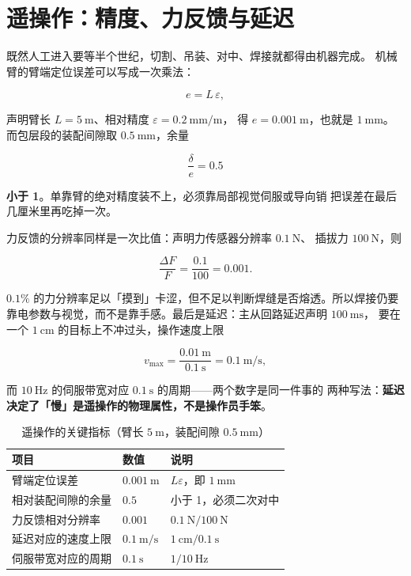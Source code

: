 \section{遥操作：精度、力反馈与延迟}
\label{sec:app-ap-teleop}

既然人工进入要等半个世纪，切割、吊装、对中、焊接就都得由机器完成。
机械臂的臂端定位误差可以写成一次乘法：

\begin{equation}
e = L\,\varepsilon,
\label{eq:app-ap-err}
\end{equation}

声明臂长 $L = 5\ \mathrm{m}$、相对精度 $\varepsilon = 0.2\ \mathrm{mm}/\mathrm{m}$，
得 $e = 0.001\ \mathrm{m}$，也就是 \textbf{$1\ \mathrm{mm}$}。而包层段的装配间隙取
$0.5\ \mathrm{mm}$，余量

\begin{equation}
\frac{\delta}{e} = 0.5
\label{eq:app-ap-margin}
\end{equation}

\textbf{小于 1}。单靠臂的绝对精度装不上，必须靠局部视觉伺服或导向销
把误差在最后几厘米里再吃掉一次。

力反馈的分辨率同样是一次比值：声明力传感器分辨率 $0.1\ \mathrm{N}$、
插拔力 $100\ \mathrm{N}$，则

\begin{equation}
\frac{\Delta F}{F} = \frac{0.1}{100} = 0.001.
\label{eq:app-ap-force}
\end{equation}

$0.1\%$ 的力分辨率足以「摸到」卡涩，但不足以判断焊缝是否熔透。所以焊接仍要
靠电参数与视觉，而不是靠手感。最后是延迟：主从回路延迟声明 $100\ \mathrm{ms}$，
要在一个 $1\ \mathrm{cm}$ 的目标上不冲过头，操作速度上限

\begin{equation}
v_{\max} = \frac{0.01\ \mathrm{m}}{0.1\ \mathrm{s}} = 0.1\ \mathrm{m}/\mathrm{s},
\label{eq:app-ap-latency}
\end{equation}

而 $10\ \mathrm{Hz}$ 的伺服带宽对应 $0.1\ \mathrm{s}$ 的周期——两个数字是同一件事的
两种写法：\textbf{延迟决定了「慢」是遥操作的物理属性，不是操作员手笨}。

\begin{table}[htbp]
\centering
\small
\caption{遥操作的关键指标（臂长 $5\ \mathrm{m}$，装配间隙 $0.5\ \mathrm{mm}$）}
\label{tab:app-ap-teleop}
\setlength{\tabcolsep}{4pt}
\begin{tabular}{p{5.8cm}p{4.2cm}p{5.6cm}}
\toprule
项目 & 数值 & 说明 \\
\midrule
臂端定位误差 & $0.001\ \mathrm{m}$ & $L\varepsilon$，即 $1\ \mathrm{mm}$ \\
相对装配间隙的余量 & $0.5$ & 小于 1，必须二次对中 \\
力反馈相对分辨率 & $0.001$ & $0.1\ \mathrm{N} / 100\ \mathrm{N}$ \\
延迟对应的速度上限 & $0.1\ \mathrm{m}/\mathrm{s}$ & $1\ \mathrm{cm} / 0.1\ \mathrm{s}$ \\
伺服带宽对应的周期 & $0.1\ \mathrm{s}$ & $1/10\ \mathrm{Hz}$ \\
\bottomrule
\end{tabular}
\end{table}

